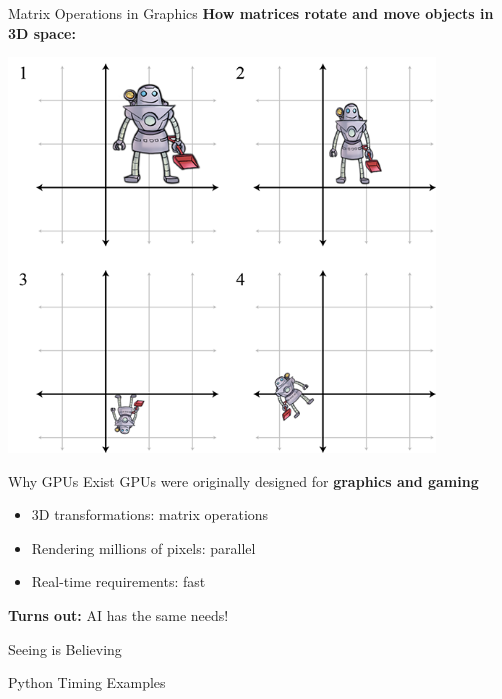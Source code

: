 \documentclass[10pt]{beamer}
\begin{document}
\begin{frame}{Matrix Operations in Graphics}
  \textbf{How matrices rotate and move objects in 3D space:}
  
  \vspace{0.5em}
  \begin{center}
    \includegraphics[width=0.85\textwidth,height=0.7\textheight,keepaspectratio]{images/exercise_match_matrix_to_picture.png}
  \end{center}
\end{frame}

\begin{frame}{Why GPUs Exist}
  GPUs were originally designed for \textbf{graphics and gaming}
  
  \vspace{1em}
  \begin{itemize}
    \item 3D transformations: matrix operations
    \item Rendering millions of pixels: parallel
    \item Real-time requirements: fast
  \end{itemize}
  
  \vspace{1em}
  \centering
  \textbf{Turns out:} AI has the same needs!
\end{frame}

\begin{frame}[standout]
  \Huge Seeing is Believing
  
  \vspace{1em}
  \Large Python Timing Examples
\end{frame}
\end{document}
